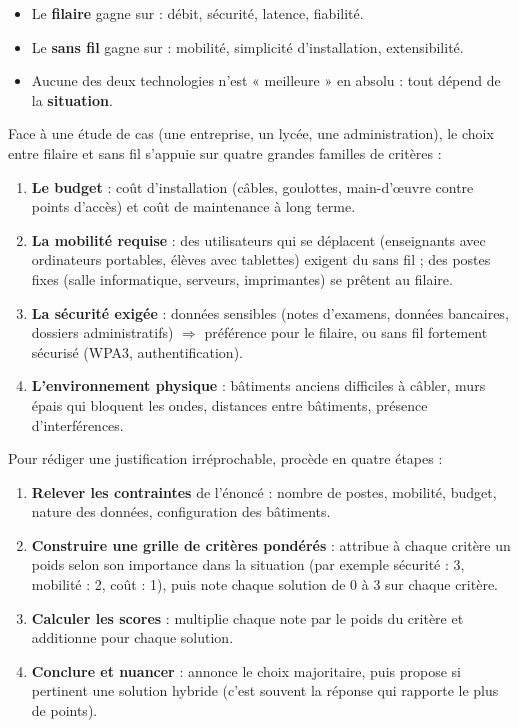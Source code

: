 \documentclass[11pt]{article}
\newcounter{popsec}
\newcounter{popsub}
\newcommand{\courssub}[1]{%
  \stepcounter{popsub}%
  \par\vspace{9pt}\noindent{\popxbold\fontsize{11.5}{13}\selectfont\color{popink}{\color{poporange}\thepopsec.\thepopsub}\hspace{6pt}#1}\par\nopagebreak\vspace{4pt}
}
\begin{document}
\begin{aretenir}
\begin{itemize}
\item Le \textbf{filaire} gagne sur : débit, sécurité, latence, fiabilité.
\item Le \textbf{sans fil} gagne sur : mobilité, simplicité d'installation, extensibilité.
\item Aucune des deux technologies n'est « meilleure » en absolu : tout dépend de la \textbf{situation}.
\end{itemize}
\end{aretenir}

\courssub{Critères de choix selon la situation}

Face à une étude de cas (une entreprise, un lycée, une administration), le choix entre filaire et sans fil s'appuie sur quatre grandes familles de critères :

\begin{enumerate}
\item \textbf{Le budget} : coût d'installation (câbles, goulottes, main-d'œuvre contre points d'accès) et coût de maintenance à long terme.
\item \textbf{La mobilité requise} : des utilisateurs qui se déplacent (enseignants avec ordinateurs portables, élèves avec tablettes) exigent du sans fil ; des postes fixes (salle informatique, serveurs, imprimantes) se prêtent au filaire.
\item \textbf{La sécurité exigée} : données sensibles (notes d'examens, données bancaires, dossiers administratifs) $\Rightarrow$ préférence pour le filaire, ou sans fil fortement sécurisé (WPA3, authentification).
\item \textbf{L'environnement physique} : bâtiments anciens difficiles à câbler, murs épais qui bloquent les ondes, distances entre bâtiments, présence d'interférences.
\end{enumerate}

\begin{methode}
Pour rédiger une justification irréprochable, procède en quatre étapes :
\begin{enumerate}
\item \textbf{Relever les contraintes} de l'énoncé : nombre de postes, mobilité, budget, nature des données, configuration des bâtiments.
\item \textbf{Construire une grille de critères pondérés} : attribue à chaque critère un poids selon son importance dans la situation (par exemple sécurité : 3, mobilité : 2, coût : 1), puis note chaque solution de 0 à 3 sur chaque critère.
\item \textbf{Calculer les scores} : multiplie chaque note par le poids du critère et additionne pour chaque solution.
\item \textbf{Conclure et nuancer} : annonce le choix majoritaire, puis propose si pertinent une solution hybride (c'est souvent la réponse qui rapporte le plus de points).
\end{enumerate}
\end{methode}
\end{document}
